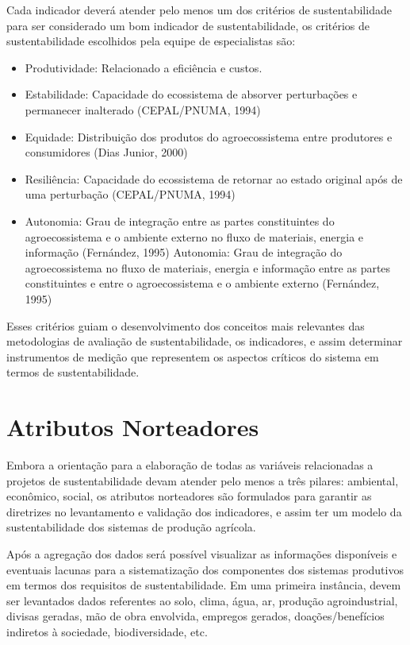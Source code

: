 Cada indicador deverá atender pelo menos um dos critérios de sustentabilidade
para ser considerado um bom indicador de sustentabilidade, os critérios
de sustentabilidade escolhidos pela equipe de especialistas são:
\begin{itemize}
\item Produtividade: Relacionado a eficiência e custos.
\item Estabilidade: Capacidade do ecossistema de absorver perturbações e
permanecer inalterado (CEPAL/PNUMA,
1994) \citet{moura2002indicadores}
\item Equidade: Distribuição dos produtos do agroecossistema entre produtores
e consumidores (Dias Junior, 2000) \citet{moura2002indicadores}
\item Resiliência: Capacidade do ecossistema de retornar ao estado original
após de uma perturbação (CEPAL/PNUMA, 1994) \citep{moura2002indicadores}
\item Autonomia: Grau de integração entre as partes constituintes do agroecossistema
e o ambiente externo no fluxo de materiais, energia e informação (Fernández,
1995) \citep{moura2002indicadores}Autonomia: Grau de integração do
agroecossistema no fluxo de materiais, energia e informação entre
as partes constituintes e entre o agroecossistema e o ambiente externo
(Fernández, 1995) \citep{moura2002indicadores}
\end{itemize}
Esses critérios guiam o desenvolvimento dos conceitos mais relevantes
das metodologias de avaliação de sustentabilidade, os indicadores,
e assim determinar instrumentos de medição que representem os aspectos
críticos do sistema em termos de sustentabilidade.

\section{Atributos Norteadores}

Embora a orientação para a elaboração de todas as variáveis relacionadas
a projetos de sustentabilidade devam atender pelo menos a três pilares:
ambiental, econômico, social, os atributos norteadores são formulados
para garantir as diretrizes no levantamento e validação dos indicadores,
e assim ter um modelo da sustentabilidade dos sistemas de produção
agrícola.

Após a agregação dos dados será possível visualizar as informações
disponíveis e eventuais lacunas para a sistematização dos componentes
dos sistemas produtivos em termos dos requisitos de sustentabilidade.
Em uma primeira instância, devem ser levantados dados referentes ao
solo, clima, água, ar, produção agroindustrial, divisas geradas, mão
de obra envolvida, empregos gerados, doações/benefícios indiretos
à sociedade, biodiversidade, etc.

